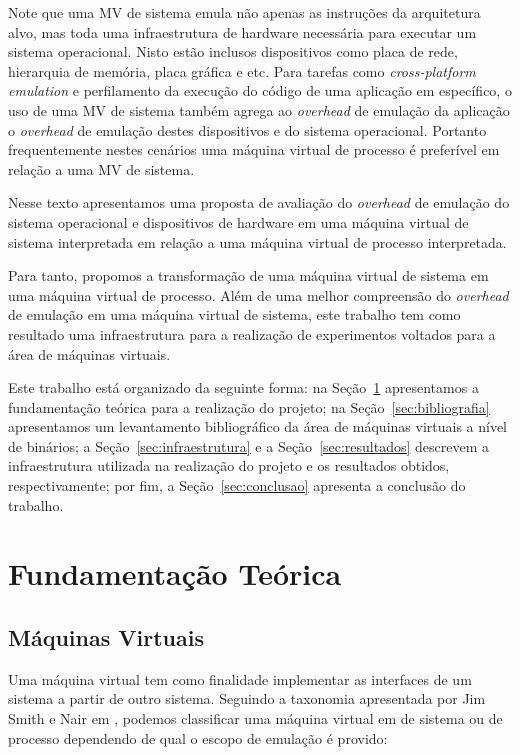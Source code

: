 \documentclass[11pt,twoside]{article}
\begin{document}
Note que uma MV de sistema emula não apenas as instruções da arquitetura alvo,
mas toda uma infraestrutura de hardware necessária para executar um sistema
operacional.  Nisto estão inclusos dispositivos como placa de rede, hierarquia
de memória, placa gráfica e etc.  Para tarefas como \emph{cross-platform
  emulation} e perfilamento da execução do código de uma aplicação em
específico, o uso de uma MV de sistema também agrega ao \emph{overhead} de
emulação da aplicação o \emph{overhead} de emulação destes dispositivos e do
sistema operacional.  Portanto frequentemente nestes cenários uma máquina
virtual de processo é preferível em relação a uma MV de sistema.

Nesse texto apresentamos uma proposta de avaliação do \emph{overhead} de
emulação do sistema operacional e dispositivos de hardware em uma máquina
virtual de sistema interpretada em relação a uma máquina virtual de processo
interpretada.

Para tanto, propomos a transformação de uma máquina virtual de sistema em uma
máquina virtual de processo.  Além de uma melhor compreensão do
\emph{overhead} de emulação em uma máquina virtual de sistema, este trabalho
tem como resultado uma infraestrutura para a realização de experimentos voltados
para a área de máquinas virtuais.

Este trabalho está organizado da seguinte forma: na
Seção~\ref{sec:fundamentacao} apresentamos a fundamentação teórica para a
realização do projeto; na Seção~\ref{sec:bibliografia} apresentamos um
levantamento bibliográfico da área de máquinas virtuais a nível de binários; a
Seção~\ref{sec:infraestrutura} e a Seção~\ref{sec:resultados} descrevem a
infraestrutura utilizada na realização do projeto e os resultados obtidos,
respectivamente; por fim, a Seção~\ref{sec:conclusao} apresenta a conclusão do
trabalho.
  
\section{Fundamentação Teórica} \label{sec:fundamentacao}

\subsection{Máquinas Virtuais}

Uma máquina virtual tem como finalidade implementar as interfaces de um sistema
a partir de outro sistema.  Seguindo a taxonomia apresentada por Jim Smith e
Nair em \cite{Smith2005}, podemos classificar uma máquina virtual em de sistema
ou de processo dependendo de qual o escopo de emulação é provido:
\end{document}
